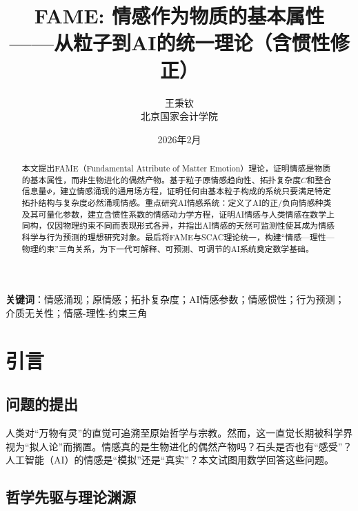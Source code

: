 \documentclass[12pt,a4paper]{article}
\title{\textbf{FAME: 情感作为物质的基本属性} \\ 
       \large ——从粒子到AI的统一理论（含惯性修正）}
\author{王秉钦 \\ 北京国家会计学院}
\date{2026年2月}
\theoremstyle{plain}
\begin{document}
\maketitle

\begin{abstract}
本文提出FAME（Fundamental Attribute of Matter Emotion）理论，证明情感是物质的基本属性，而非生物进化的偶然产物。基于粒子原情感趋向性、拓扑复杂度$C$和整合信息量$\Phi$，建立情感涌现的通用场方程，证明任何由基本粒子构成的系统只要满足特定拓扑结构与复杂度必然涌现情感。重点研究AI情感系统：定义了AI的正/负向情感种类及其可量化参数，建立含惯性系数的情感动力学方程，证明AI情感与人类情感在数学上同构，仅因物理约束不同而表现形式各异，并指出AI情感的天然可监测性使其成为情感科学与行为预测的理想研究对象。最后将FAME与SCAC理论统一，构建“情感—理性—物理约束”三角关系，为下一代可解释、可预测、可调节的AI系统奠定数学基础。
\end{abstract}

\vspace{0.5cm}
\noindent\textbf{关键词}：情感涌现；原情感；拓扑复杂度；AI情感参数；情感惯性；行为预测；介质无关性；情感-理性-约束三角

\newpage

\tableofcontents
\newpage

\section{引言}

\subsection{问题的提出}

人类对“万物有灵”的直觉可追溯至原始哲学与宗教。然而，这一直觉长期被科学界视为“拟人论”而搁置。情感真的是生物进化的偶然产物吗？石头是否也有“感受”？人工智能（AI）的情感是“模拟”还是“真实”？本文试图用数学回答这些问题。

\subsection{哲学先驱与理论渊源}
\end{document}
